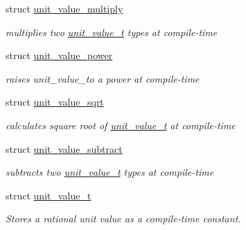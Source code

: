 \begin{DoxyCompactItemize}
struct \hyperlink{structunits_1_1unit__value__multiply}{unit\+\_\+value\+\_\+multiply}
\begin{DoxyCompactList}\small\item\em multiplies two \hyperlink{structunits_1_1unit__value__t}{unit\+\_\+value\+\_\+t} types at compile-\/time \end{DoxyCompactList}\item 
struct \hyperlink{structunits_1_1unit__value__power}{unit\+\_\+value\+\_\+power}
\begin{DoxyCompactList}\small\item\em raises unit\+\_\+value\+\_\+to a power at compile-\/time \end{DoxyCompactList}\item 
struct \hyperlink{structunits_1_1unit__value__sqrt}{unit\+\_\+value\+\_\+sqrt}
\begin{DoxyCompactList}\small\item\em calculates square root of \hyperlink{structunits_1_1unit__value__t}{unit\+\_\+value\+\_\+t} at compile-\/time \end{DoxyCompactList}\item 
struct \hyperlink{structunits_1_1unit__value__subtract}{unit\+\_\+value\+\_\+subtract}
\begin{DoxyCompactList}\small\item\em subtracts two \hyperlink{structunits_1_1unit__value__t}{unit\+\_\+value\+\_\+t} types at compile-\/time \end{DoxyCompactList}\item 
struct \hyperlink{structunits_1_1unit__value__t}{unit\+\_\+value\+\_\+t}
\begin{DoxyCompactList}\small\item\em Stores a rational unit value as a compile-\/time constant. \end{DoxyCompactList}\end{DoxyCompactItemize}
